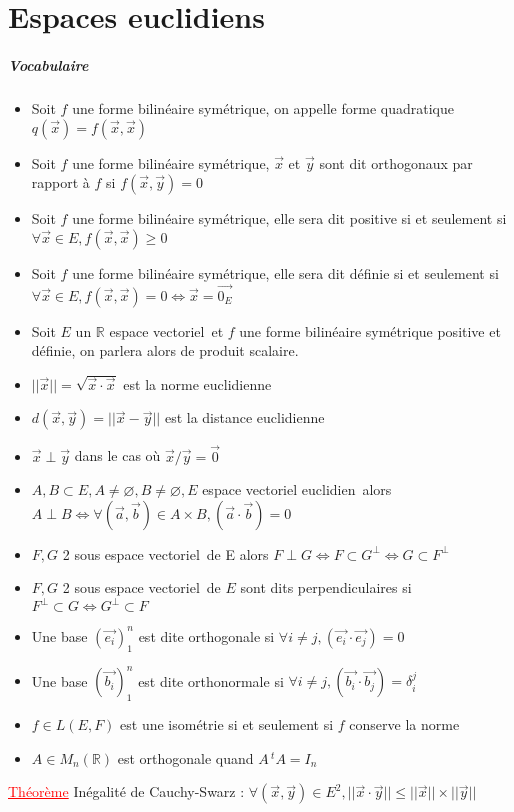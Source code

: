 \documentclass[a4paper, 11pt, french]{article}
\newcommand{\R}{\mathbb{R}}
\newcommand{\de}{\delta}
\newcommand{\ev}{espace vectoriel}
\newcommand{\eve}{espace vectoriel euclidien}
\newcommand{\thm}{\textcolor{red}{\underline{Théorème} }}
\begin{document}
	\section*{Espaces euclidiens}
	\subparagraph*{Vocabulaire}
	\begin{itemize}
 		\item Soit $f$ une forme bilinéaire symétrique, on appelle forme quadratique $q(\vec{x})=f(\vec{x},\vec{x})$
		\item Soit $f$ une forme bilinéaire symétrique, $\vec{x}$ et $\vec{y}$ sont dit orthogonaux par rapport à $f$ si $f(\vec{x},\vec{y})=0$
		\item Soit $f$ une forme bilinéaire symétrique, elle sera dit positive si et seulement si $\forall \vec{x} \in  E, f(\vec{x},\vec{x})\geqslant 0$
		\item Soit $f$ une forme bilinéaire symétrique, elle sera dit définie si et seulement si ${\forall \vec{x} \in  E}, f(\vec{x},\vec{x})=0 \iff \vec{x}=\vec{0_E}$
		\item Soit $E$ un $\R$ \ev \, et $f$ une forme bilinéaire symétrique positive et définie, on parlera alors de produit scalaire.
		\item $||\vec{x}||=\sqrt{\vec{x} \cdot \vec{x}}$ est la norme euclidienne
		\item $d(\vec{x},\vec{y})=||\vec{x}-\vec{y}||$ est la distance euclidienne
		\item $\vec{x}\perp\vec{y}$ dans le cas où $\vec{x}/\vec{y}=\vec{0}$
		\item $A,B \subset E, A \neq \varnothing, B \neq \varnothing, E$ \eve \, alors $A\perp B \iff {\forall (\vec{a},\vec{b}) \in A\times B}, {(\vec{a}\cdot\vec{b})=0}$
		\item $F,G$ 2 sous \ev \, de E alors $F\perp G \iff F\subset G^{\perp} \iff G \subset F^{\perp}$
		\item $F,G$ 2 sous \ev \, de $E$ sont dits perpendiculaires si ${F^{\perp} \subset G \iff G^{\perp} \subset F}$
		\item Une base $(\vec{e_i})_1^n$ est dite orthogonale si $\forall i \neq j, (\vec{e_i}\cdot \vec{e_j})=0$
		\item Une base $(\vec{b_i})_1^n$ est dite orthonormale si $\forall i \neq j, (\vec{b_i}\cdot \vec{b_j})=\de_i^j$
		\item $f \in L(E,F)$ est une isométrie si et seulement si $f$ conserve la norme 
		\item $A \in M_n(\R)$ est orthogonale quand $A\,^tA=I_n$
	\end{itemize}
	 \thm Inégalité de Cauchy-Swarz : $\forall (\vec{x},\vec{y}) \in E^2, ||\vec{x}\cdot\vec{y}|| \leqslant ||\vec{x}|| \times ||\vec{y}||$ \\
\end{document}
